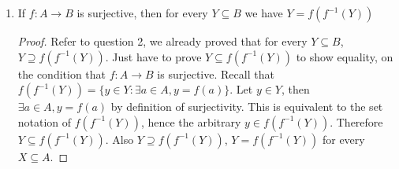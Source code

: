 \documentclass[11pt]{article}
\begin{document}
\begin{enumerate}
  \item If $f:A\to B$ is surjective, then for every $Y\subseteq B$ we have $Y = f(f^{-1}(Y))$
  \begin{proof}
    Refer to question 2, we already proved that for every $Y\subseteq B$, $Y \supseteq f(f^{-1}(Y))$. Just have to prove $Y \subseteq f(f^{-1}(Y))$ to show equality, on the condition that $f:A\to B$ is surjective. Recall that $f(f^{-1}(Y)) = \{ y\in Y: \exists a\in A, y = f(a)\}$. Let $y\in Y$, then $\exists a\in A, y=f(a)$ by definition of surjectivity. This is equivalent to the set notation of $f(f^{-1}(Y))$, hence the arbitrary $y \in f(f^{-1}(Y))$. Therefore $Y \subseteq f(f^{-1}(Y))$. Also $Y \supseteq f(f^{-1}(Y))$, $Y=f(f^{-1}(Y))$ for every $X \subseteq A$.
  \end{proof}
\end{enumerate}






\end{document}

